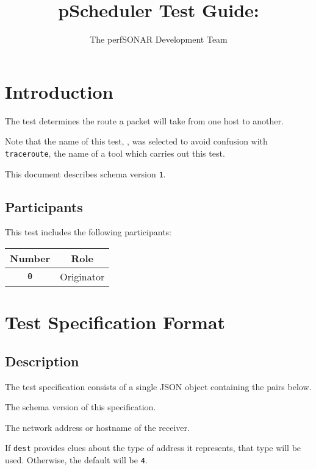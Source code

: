 \documentclass[10pt]{article}
\title{pScheduler Test Guide: {\it \testname}}
\author{The perfSONAR Development Team}
\begin{document}
\maketitle


%
%

\section{Introduction}

The {\tt \testname} test determines the route a packet will take from
one host to another.

Note that the name of this test, {\tt \testname}, was selected to
avoid confusion with {\tt traceroute}, the name of a tool which
carries out this test.

This document describes schema version {\tt 1}.

\subsection{Participants}

This test includes the following participants:

\begin{center}
\begin{tabular}{|c|c|}
\hline
{\bf Number} & {\bf Role} \\
\hline
{\tt 0} & Originator \\
\hline
\end{tabular}
\end{center}



%
%

\section{Test Specification Format}

\subsection{Description}

The test specification consists of a single JSON object containing the
pairs below.  \seejson

 The schema version of this specification.

 The network address or hostname of the receiver.

 If {\tt dest} provides clues about the type of
address it represents, that type will be used.  Otherwise, the default
will be {\tt 4}.
\end{document}
